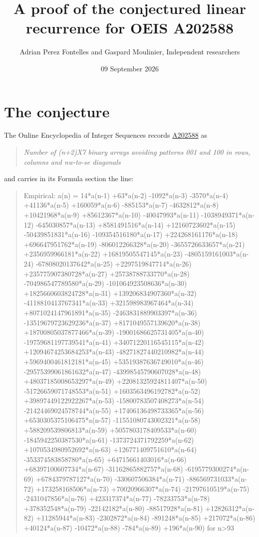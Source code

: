 \documentclass[11pt]{article}
\title{A proof of the conjectured linear recurrence for OEIS A202588}
\author{Adrian Perez Fontelles and Gaspard Moulinier, Independent researchers}
\date{09 September 2026}
\theoremstyle{definition}
\begin{document}
\maketitle
\section{The conjecture}

The Online Encyclopedia of Integer Sequences records \href{https://oeis.org/A202588}{A202588} as

\begin{quote}\itshape Number of (n+2)X7 binary arrays avoiding patterns 001 and 100 in rows, columns and nw-to-se diagonals\end{quote}

and carries in its Formula section the line:

\begin{quote}\ttfamily Empirical: a(n) = 14*a(n-1) +63*a(n-2) -1092*a(n-3) -3570*a(n-4) +41136*a(n-5) +160059*a(n-6) -885153*a(n-7) -4632812*a(n-8) +10421968*a(n-9) +85612367*a(n-10) -40047993*a(n-11) -1038949371*a(n-12) -645030857*a(n-13) +8581491516*a(n-14) +12160723602*a(n-15) -50439851831*a(n-16) -109354516180*a(n-17) +224268161176*a(n-18) +696647951762*a(n-19) -806012266328*a(n-20) -3655726633657*a(n-21) +2356959966181*a(n-22) +16819505547145*a(n-23) -4805159161003*a(n-24) -67808020137642*a(n-25) +2297519847714*a(n-26) +235775907380728*a(n-27) +25738788733770*a(n-28) -704986547789580*a(n-29) -101064923508636*a(n-30) +1825660603824728*a(n-31) +139206834907360*a(n-32) -4118810413767341*a(n-33) +321598983967464*a(n-34) +8071024147961891*a(n-35) -2463831889903397*a(n-36) -13519679723629236*a(n-37) +8171049557139620*a(n-38) +18700805037877466*a(n-39) -19001686625731405*a(n-40) -19759681197739541*a(n-41) +34071220116545115*a(n-42) +12094674253684253*a(n-43) -48271827440210982*a(n-44) +5969400461812181*a(n-45) +53519387636749010*a(n-46) -29575399061861632*a(n-47) -43998545790607028*a(n-48) +48037185008653297*a(n-49) +22081325924811407*a(n-50) -51726659071748553*a(n-51) +1603563496192782*a(n-52) +39897449122922267*a(n-53) -15800783507408273*a(n-54) -21424469024578744*a(n-55) +17406136498733365*a(n-56) +6530305375106475*a(n-57) -11551080743002321*a(n-58) +588209539806813*a(n-59) +5057803178409533*a(n-60) -1845942250387530*a(n-61) -1373724371792259*a(n-62) +1070534980952692*a(n-63) +126771409751610*a(n-64) -353374583858780*a(n-65) +64715661403016*a(n-66) +68397100607734*a(n-67) -31162865882757*a(n-68) -6195779300274*a(n-69) +6784379787127*a(n-70) -330607506384*a(n-71) -886569731033*a(n-72) +173258168506*a(n-73) +70020966307*a(n-74) -21797610519*a(n-75) -2431047856*a(n-76) +423317374*a(n-77) -78233753*a(n-78) +378352548*a(n-79) -22142182*a(n-80) -88517928*a(n-81) +12826312*a(n-82) +11285944*a(n-83) -2302872*a(n-84) -891248*a(n-85) +217072*a(n-86) +40124*a(n-87) -10472*a(n-88) -784*a(n-89) +196*a(n-90) for n>93\end{quote}
\end{document}
